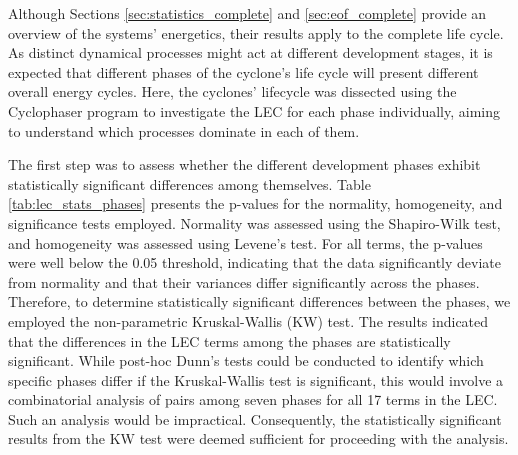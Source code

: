 Although Sections \ref{sec:statistics_complete} and \ref{sec:eof_complete} provide an overview of the systems' energetics, their results apply to the complete life cycle. As distinct dynamical processes might act at different development stages, it is expected that different phases of the cyclone's life cycle will present different overall energy cycles. Here, the cyclones' lifecycle was dissected using the Cyclophaser program to investigate the LEC for each phase individually, aiming to understand which processes dominate in each of them.

The first step was to assess whether the different development phases exhibit statistically significant differences among themselves. Table \ref{tab:lec_stats_phases} presents the p-values for the normality, homogeneity, and significance tests employed. Normality was assessed using the Shapiro-Wilk test, and homogeneity was assessed using Levene's test. For all terms, the p-values were well below the 0.05 threshold, indicating that the data significantly deviate from normality and that their variances differ significantly across the phases. Therefore, to determine statistically significant differences between the phases, we employed the non-parametric Kruskal-Wallis (KW) test. The results indicated that the differences in the LEC terms among the phases are statistically significant.  While post-hoc Dunn's tests could be conducted to identify which specific phases differ if the Kruskal-Wallis test is significant, this would involve a combinatorial analysis of pairs among seven phases for all 17 terms in the LEC. Such an analysis would be impractical. Consequently, the statistically significant results from the KW test were deemed sufficient for proceeding with the analysis.

